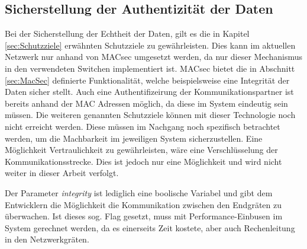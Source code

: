 \subsection{Sicherstellung der Authentizität der Daten}
Bei der Sicherstellung der Echtheit der Daten, gilt es die in Kapitel \ref{sec:Schutzziele} erwähnten Schutzziele zu gewährleisten. Dies kann im aktuellen Netzwerk nur anhand von \acl{MACsec} umgesetzt werden, da nur dieser Mechanismus in den verwendeten Switchen implementiert ist. \acs{MACsec} bietet die in Abschnitt \ref{sec:MacSec} definierte Funktionalität, welche beispielsweise eine Integrität der Daten sicher stellt. Auch eine Authentifizeirung der Kommunikationspartner ist bereits anhand der \ac{MAC} Adressen möglich, da diese im System eindeutig sein müssen.
Die weiteren genannten Schutzziele können mit dieser Technologie noch nicht erreicht werden. Diese müssen im Nachgang noch spezifisch betrachtet werden, um die Machbarkeit im jeweiligen System sicherzustellen. Eine Möglichkeit Vertraulichkeit zu gewährleisten, wäre eine Verschlüsselung der Kommunikationsstrecke. Dies ist jedoch nur eine Möglichkeit und wird nicht weiter in dieser Arbeit verfolgt.

Der Parameter \emph{integrity} ist lediglich eine boolische Variabel und gibt dem Entwicklern die Möglichkeit die Kommunikation zwischen den Endgräten zu überwachen. Ist dieses sog. Flag gesetzt, muss mit Performance-Einbusen im System gerechnet werden, da es einerseits Zeit kostete, aber auch Rechenleitung in den Netzwerkgräten.


